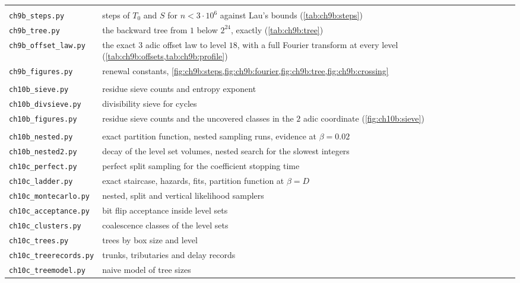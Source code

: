 {\begin{longtable}{@{}l>{\raggedright\arraybackslash}p{}@{}}
\addlinespace[4pt]
\multicolumn{2}{@{}l}{\itshape\Cref{chap:backward}} \\*
\texttt{ch9b\_steps.py} & steps of $T_0$ and $S$ for $n<3\cdot10^6$ against Lau's bounds (\cref{tab:ch9b:steps}) \\
\texttt{ch9b\_tree.py} & the backward tree from $1$ below $2^{24}$, exactly (\cref{tab:ch9b:tree}) \\
\texttt{ch9b\_offset\_law.py} & the exact $3$ adic offset law to level $18$, with a full Fourier transform at every level (\cref{tab:ch9b:offsets,tab:ch9b:profile}) \\
\texttt{ch9b\_figures.py} & renewal constants, \cref{fig:ch9b:steps,fig:ch9b:fourier,fig:ch9b:tree,fig:ch9b:crossing} \\
\addlinespace[4pt]
\multicolumn{2}{@{}l}{\itshape\Cref{chap:computation}} \\*
\texttt{ch10b\_sieve.py} & residue sieve counts and entropy exponent \\
\texttt{ch10b\_divsieve.py} & divisibility sieve for cycles \\
\texttt{ch10b\_figures.py} & residue sieve counts and the uncovered classes in the $2$ adic coordinate (\cref{fig:ch10b:sieve}) \\
\addlinespace[4pt]
\multicolumn{2}{@{}l}{\itshape\Cref{chap:samplers}} \\*
\texttt{ch10b\_nested.py} & exact partition function, nested sampling runs, evidence at $\beta=0.02$ \\
\texttt{ch10b\_nested2.py} & decay of the level set volumes, nested search for the slowest integers \\
\texttt{ch10c\_perfect.py} & perfect split sampling for the coefficient stopping time \\
\texttt{ch10c\_ladder.py} & exact staircase, hazards, fits, partition function at $\beta=D$ \\
\texttt{ch10c\_montecarlo.py} & nested, split and vertical likelihood samplers \\
\texttt{ch10c\_acceptance.py} & bit flip acceptance inside level sets \\
\texttt{ch10c\_clusters.py} & coalescence classes of the level sets \\
\texttt{ch10c\_trees.py} & trees by box size and level \\
\texttt{ch10c\_treerecords.py} & trunks, tributaries and delay records \\
\texttt{ch10c\_treemodel.py} & naive model of tree sizes \\

\end{longtable}}
